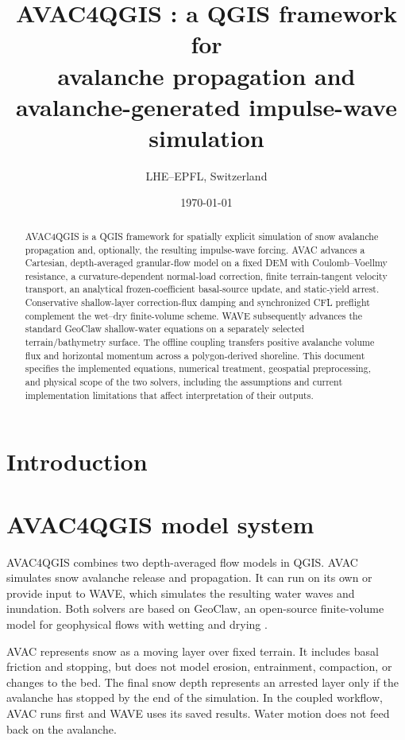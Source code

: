 \documentclass[11pt,a4paper]{article}
\title{\textbf{AVAC4QGIS \modelversion: a QGIS framework for\\
avalanche propagation and avalanche-generated impulse-wave simulation}}
\author{LHE--EPFL, Switzerland}
\date{\today}
\begin{document}
\maketitle
\thispagestyle{empty}


\begin{abstract}
AVAC4QGIS is a QGIS framework for spatially explicit simulation of snow
avalanche propagation and, optionally, the resulting impulse-wave forcing.
AVAC advances a Cartesian, depth-averaged granular-flow model on a fixed DEM
with Coulomb--Voellmy resistance, a curvature-dependent normal-load correction,
finite terrain-tangent velocity transport, an analytical frozen-coefficient
basal-source update, and static-yield arrest. Conservative shallow-layer
correction-flux damping and synchronized CFL preflight complement the
wet--dry finite-volume scheme.
WAVE subsequently advances the standard GeoClaw
shallow-water equations on a separately selected terrain/bathymetry surface.
The offline coupling transfers positive avalanche volume flux and horizontal
momentum across a polygon-derived shoreline. This document specifies the
implemented equations, numerical treatment, geospatial preprocessing, and
physical scope of the two solvers, including the assumptions and current
implementation limitations that affect interpretation of their outputs.
\end{abstract}



\clearpage
\tableofcontents
\clearpage


\section{Introduction}
\label{sec:introduction}



\newpage
\section{AVAC4QGIS model system}
\label{sec:model-system}

AVAC4QGIS combines two depth-averaged flow models in QGIS. AVAC simulates snow
avalanche release and propagation. It can run on its own or provide input to
WAVE, which simulates the resulting water waves and inundation. Both solvers
are based on GeoClaw, an open-source finite-volume model for geophysical flows
with wetting and drying \citep{George2008,BergerEtAl2011}.

AVAC represents snow as a moving layer over fixed terrain. It includes basal
friction and stopping, but does not model erosion, entrainment, compaction,
or changes to the bed. The final snow depth represents an arrested layer only
if the avalanche has stopped by the end of the simulation. In the coupled
workflow, AVAC runs first and WAVE uses its saved results. Water motion does
not feed back on the avalanche.
\end{document}
